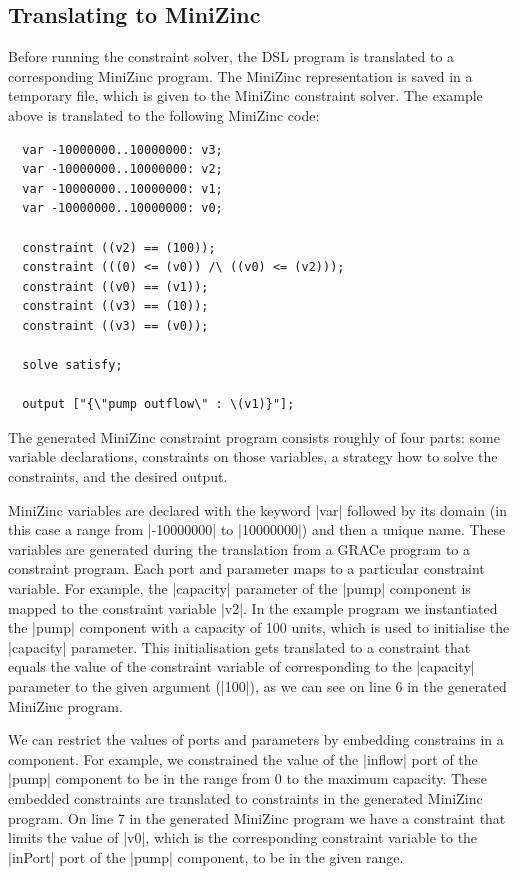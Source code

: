 \documentclass{article}
\begin{document}
\subsection{Translating to MiniZinc}

Before running the constraint solver, the DSL program is translated to
a corresponding MiniZinc program.
%
The MiniZinc representation is saved in a temporary file, which is
given to the MiniZinc constraint solver.
%
The example above is translated to the following MiniZinc code:
%
\begin{verbatim}
  var -10000000..10000000: v3;
  var -10000000..10000000: v2;
  var -10000000..10000000: v1;
  var -10000000..10000000: v0;

  constraint ((v2) == (100));
  constraint (((0) <= (v0)) /\ ((v0) <= (v2)));
  constraint ((v0) == (v1));
  constraint ((v3) == (10));
  constraint ((v3) == (v0));

  solve satisfy;

  output ["{\"pump outflow\" : \(v1)}"];
\end{verbatim}
%
The generated MiniZinc constraint program consists roughly of four
parts: some variable declarations, constraints on those variables, a
strategy how to solve the constraints, and the desired output.

MiniZinc variables are declared with the keyword |var| followed by its
domain (in this case a range from |-10000000| to |10000000|) and then
a unique name.
%
These variables are generated during the translation from a GRACe
program to a constraint program.
%
Each port and parameter maps to a particular constraint variable.
%
For example, the |capacity| parameter of the |pump| component is
mapped to the constraint variable |v2|.
%
In the example program we instantiated the |pump| component with a
capacity of 100 units, which is used to initialise the |capacity|
parameter.
%
This initialisation gets translated to a constraint that equals the
value of the constraint variable of corresponding to the |capacity|
parameter to the given argument (|100|), as we can see on line 6 in
the generated MiniZinc program.

We can restrict the values of ports and parameters by embedding
constrains in a component.
%
For example, we constrained the value of the |inflow| port of the
|pump| component to be in the range from 0 to the maximum capacity.
%
These embedded constraints are translated to constraints in the
generated MiniZinc program.
%
On line 7 in the generated MiniZinc program we have a constraint that
limits the value of |v0|, which is the corresponding constraint
variable to the |inPort| port of the |pump| component, to be in the
given range.
\end{document}
